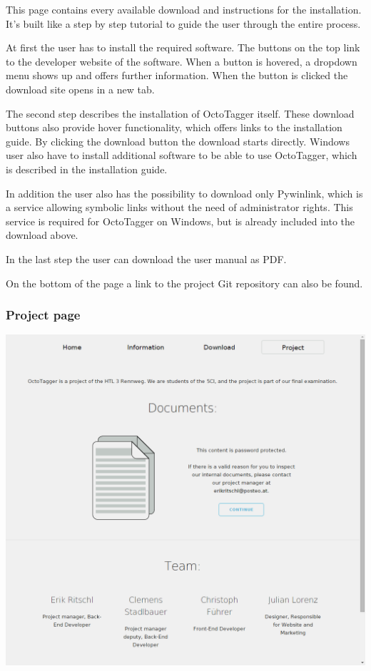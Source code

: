 This page contains every available download and instructions for the installation. It's built like a step by step tutorial to guide the user through the entire process.

At first the user has to install the required software. The buttons on the top link to the developer website of the software. When a button is hovered, a dropdown menu shows up and offers further information. When the button is clicked the download site opens in a new tab.
 
The second step describes the installation of OctoTagger itself. These download buttons also provide hover functionality, which offers links to the installation guide. By clicking the download button the download starts directly. Windows user also have to install additional software to be able to use OctoTagger, which is described in the installation guide. 

In addition the user also has the possibility to download only Pywinlink, which is a service allowing symbolic links without the need of administrator rights. This service is required for OctoTagger on Windows, but is already included into the download above.

In the last step the user can download the user manual as PDF.

On the bottom of the page a link to the project Git repository can also be found.

\subsubsection{Project page}

\begin{center}
\includegraphics[scale=0.35]{images/project_full.png}
\end{center}

